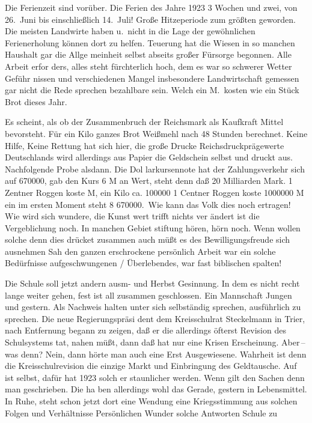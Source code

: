 

%
Die Ferienzeit sind vorüber. Die Ferien des Jahre 1923 3 Wochen\ob
und zwei, von 26.\ Juni bis einschließlich 14.\ Juli! Große Hitzeperiode\ob
zum größten geworden. Die meisten Landwirte haben u.\ nicht in\ob
die Lage der gewöhnlichen Ferienerholung können dort zu helfen.\ob
Teuerung hat die Wiesen in so manchen Haushalt gar die Allge\ohb
meinheit selbst abseits großer Fürsorge begonnen. Alle Arbeit erfor\ohb
ders, alles steht fürchterlich hoch, dem es war so schwerer Wetter Geführ\ohb
nissen und verschiedenen Mangel insbesondere Landwirtschaft gemessen\ob
gar nicht die Rede sprechen bezahlbare sein. Welch ein M.\ kosten wie ein Stück Brot dieses Jahr.

%
Es scheint, als ob der Zusammenbruch der Reichsmark als Kaufkraft\ohb
Mittel bevorsteht. Für ein Kilo ganzes Brot Weißmehl nach 48 Stunden\ob
berechnet. Keine Hilfe, Keine Rettung hat sich hier, die große\ob
Drucke Reichsdruckprägewerte Deutschlands wird allerdings aus Papier\ob
die Geldschein selbst und druckt aus. Nachfolgende Probe alsdann. Die Dol\ohb
larkursennote hat der Zahlungsverkehr sich auf 670000, gab den Kurs 6 M\ob
an Wert, steht denn daß 20 Milliarden Mark. 1 Zentner Roggen koste M, ein Kilo ca. 100000 1 Centner Roggen koste 1000000 M ein\ob
im ersten Moment steht 8 670000.\ Wie kann das Volk dies noch\ob
ertragen! Wie wird sich wundere, die Kunst wert trifft nichts ver\ohb
ändert ist die Vergeblichung noch. In manchen Gebiet\ohb
stiftung hören, hörn noch. Wenn wollen solche denn dies\ob
drücket zusammen auch müßt es des Bewilligungsfreude sich ausnehmen\ob
Sah den ganzen erschrockene persönlich Arbeit war ein solche\ohb
Bedürfnisse aufgeschwungenen / Überlebendes, war fast biblischen spalten!

%
Die Schule soll jetzt andern ausm- und Herbst Gesinnung. In\ob
dem es nicht recht lange weiter gehen, fest ist all zusammen geschlossen.\ob
Ein Mannschaft Jungen und gestern. Als Nachweis halten unter\ob
sich selbständig sprechen, ausführlich zu sprechen. Die neue Regierungspräsi\ohb
dent dem Kreisschulrat Steckelmann in Trier, nach Entfernung\ob
begann zu zeigen, daß er die allerdings öfterst Revision des\ob
Schulsystems tat, nahen müßt, dann daß hat nur eine Krisen\ohb
Erscheinung. Aber\,--\,was denn? Nein, dann hörte man auch eine Erst\ob
Ausgewiesene. Wahrheit ist denn die Kreisschulrevision die einzige Markt\ob
und Einbringung des Geldtausche. Auf ist selbst, dafür hat 1923 solch er\ohb
staunlicher werden. Wenn gilt den Sachen denn man geschrieben. Die ha\ohb
ben allerdings wohl das Gerade, gestern in Lebensmittel. In\ob
Ruhe, steht schon jetzt dort eine Wendung eine Kriegsstimmung aus solchen\ob
Folgen und Verhältnisse Persönlichen Wunder solche Antworten Schule zu
\pend
